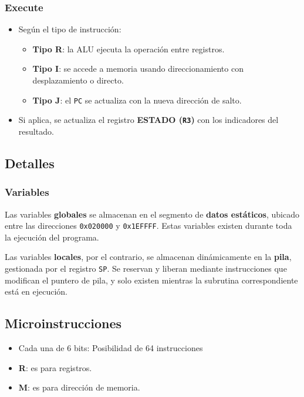 \documentclass{article}
\begin{document}
\subsubsection{Execute}

\begin{itemize}
    \item Según el tipo de instrucción:
    \begin{itemize}
        \item \textbf{Tipo R}: la ALU ejecuta la operación entre registros.
        \item \textbf{Tipo I}: se accede a memoria usando direccionamiento con desplazamiento o directo.
        \item \textbf{Tipo J}: el \texttt{PC} se actualiza con la nueva dirección de salto.
    \end{itemize}
    \item Si aplica, se actualiza el registro \textbf{ESTADO (\texttt{R3})} con los indicadores del resultado.
\end{itemize}


\subsection{Detalles}

\subsubsection{Variables}

Las variables \textbf{globales} se almacenan en el segmento de 
\textbf{datos estáticos}, ubicado entre las direcciones 
\texttt{0x020000} y \texttt{0x1EFFFF}. Estas variables 
existen durante toda la ejecución del programa.

Las variables \textbf{locales}, por el contrario, se 
almacenan dinámicamente en la \textbf{pila}, gestionada por 
el registro \texttt{SP}. Se reservan y liberan mediante 
instrucciones que modifican el puntero de pila, 
y solo existen mientras la subrutina 
correspondiente está en ejecución.

\subsection{Microinstrucciones}

\begin{itemize}
    \item Cada una de 6 bits: Posibilidad de 64 instrucciones
    \item \textbf{R}: es para registros.
    \item \textbf{M}: es para dirección de memoria.
\end{itemize}
\end{document}
